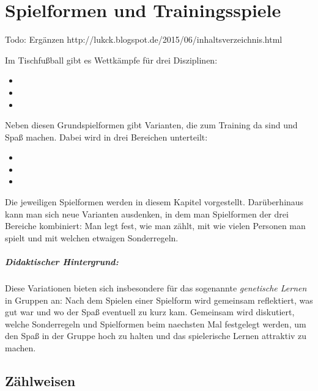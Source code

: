 \chapter{Spielformen und Trainingsspiele}
\label{spielformen}

Todo: Ergänzen http://lukck.blogspot.de/2015/06/inhaltsverzeichnis.html

Im Tischfußball gibt es Wettkämpfe für drei Disziplinen: 
\begin{itemize}
\item {}
\item {}
\item {}
\end{itemize}
Neben diesen Grundspielformen gibt Varianten, die zum Training da sind und Spaß machen. Dabei wird in drei Bereichen unterteilt:
\begin{itemize}
\item {}
\item {}
\item {}
\end{itemize}
Die jeweiligen Spielformen werden in diesem Kapitel vorgestellt. Darüberhinaus kann man sich neue Varianten ausdenken, in dem man Spielformen der drei Bereiche kombiniert: Man legt fest, wie man zählt, mit wie vielen Personen man spielt und mit welchen etwaigen Sonderregeln.

\paragraph{Didaktischer Hintergrund:} Diese Variationen bieten sich insbesondere für das sogenannte {\normalfont \itshape  genetische Lernen} in Gruppen an: Nach dem Spielen einer Spielform wird gemeinsam reflektiert, was gut war und wo der Spaß eventuell zu kurz kam. Gemeinsam wird diskutiert, welche Sonderregeln und Spielformen beim naechsten Mal festgelegt werden, um den Spaß in der Gruppe hoch zu halten und das spielerische Lernen attraktiv zu machen. 

\section{Zählweisen}
\label{spielformen:zaehlweisen}

